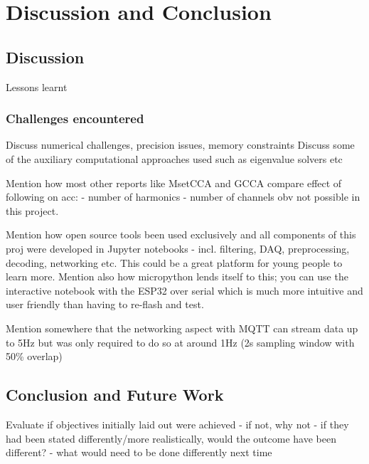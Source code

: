 \chapter{Discussion and Conclusion}
\label{chapter:discussion-conclusion}

\graphicspath{ {report/Chapter7/assets/} } 

\section{Discussion}
Lessons learnt

\subsection{Challenges encountered}
Discuss numerical challenges, precision issues, memory constraints
Discuss some of the auxiliary computational approaches used such as eigenvalue solvers etc

Mention how most other reports like MsetCCA and GCCA compare effect of following on acc:
- number of harmonics 
- number of channels
obv not possible in this project.

Mention how open source tools been used exclusively and all components of this proj were developed in Jupyter notebooks - incl. filtering, DAQ, preprocessing, decoding, networking etc. This could be a great platform for young people to learn more. Mention also how micropython lends itself to this; you can use the interactive notebook with the ESP32 over serial which is much more intuitive and user friendly than having to re-flash and test.

Mention somewhere that the networking aspect with MQTT can stream data up to 5Hz but was only required to do so at around 1Hz (2s sampling window with 50\% overlap)



\section{Conclusion and Future Work}
Evaluate if objectives initially laid out were achieved
- if not, why not
- if they had been stated differently/more realistically, would the outcome have been different?
- what would need to be done differently next time
